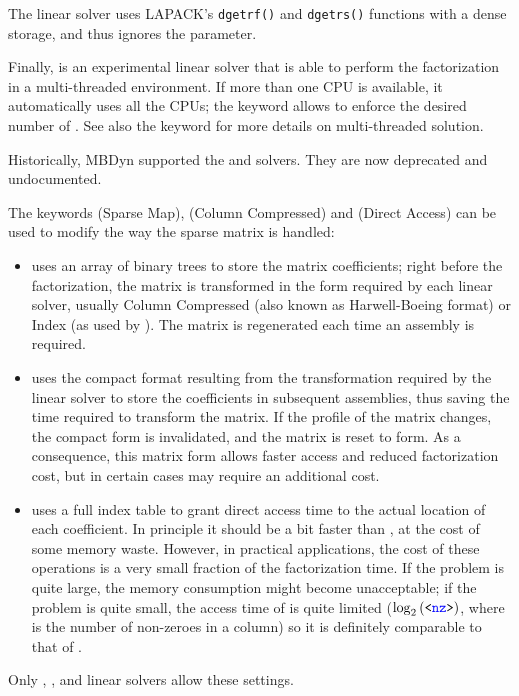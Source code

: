The  linear solver uses LAPACK's \texttt{dgetrf()} and \texttt{dgetrs()}
functions with a dense storage, and thus ignores the 
parameter.

Finally,  is an experimental linear solver that is able to perform
the factorization in a multi-threaded environment.
If more than one CPU is available, it automatically uses all the CPUs;
the keyword  allows to enforce the desired number of .
See also the  keyword for more details on multi-threaded
solution.

\begin{comment}
Another linear solver, that is available mostly for historical reasons, 
is \kw{harwell}, with a \nt{workspace\_size}
of $ \nt{numdofs}\times\nt{numdofs} $, but in certain cases the user
might prefer a smaller workspace, since the matrix is handled as sparse,
while sometimes a larger space is required, since when the matrix is
full, a little more space is required, due to extra storage needs when
the matrix fills up.
\end{comment}

Historically, MBDyn supported the  and  solvers.
They are now deprecated and undocumented.


The keywords  (Sparse Map),  (Column Compressed)
and  (Direct Access) can be used to modify the way
the sparse matrix is handled:
\begin{itemize}
\item {} uses an array of binary trees to store the matrix
coefficients; right before the factorization, the matrix is transformed
in the form required by each linear solver, usually Column Compressed
(also known as Harwell-Boeing format) or Index (as used by ).
The matrix is regenerated each time an assembly is required.
\item {} uses the compact format resulting from the transformation
required by the linear solver to store the coefficients in subsequent assemblies,
thus saving the time required to transform the matrix.
If the profile of the matrix changes, the compact form is invalidated,
and the matrix is reset to  form.  As a consequence, this matrix
form allows faster access and reduced factorization cost, but in certain
cases may require an additional cost.
\item {} uses a full index table to grant direct access time to
the actual location of each coefficient.
In principle it should be a bit faster than , at the cost
of some memory waste.
However, in practical applications, the cost of these operations
is a very small fraction of the factorization time.
If the problem is quite large, the memory consumption might
become unacceptable; if the problem is quite small, the access time
of  is quite limited ($\log_2\left( \texttt{<\textcolor{blue}{nz}>} \right)$, where
 is the number of non-zeroes in a column) so it is definitely
comparable to that of .
\end{itemize}
Only , ,  and 
linear solvers allow these settings.

